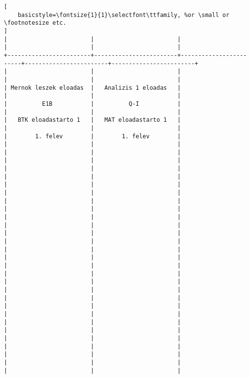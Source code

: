 \begin{lstlisting}[
    basicstyle=\fontsize{1}{1}\selectfont\ttfamily, %or \small or \footnotesize etc.
]
|                        |                        |                        |                        |                        | 
+------------------------+------------------------+------------------------+------------------------+------------------------+
|                        |                        |                        |                        |                        | 
| Mernok leszek eloadas  |   Analizis 1 eloadas   |                        |                        |                        | 
|          E1B           |          Q-I           |                        |                        |                        | 
|   BTK eloadastarto 1   |   MAT eloadastarto 1   |                        |                        |                        | 
|        1. felev        |        1. felev        |                        |                        |                        | 
|                        |                        |                        |                        |                        | 
|                        |                        |                        |                        |                        | 
|                        |                        |                        |                        |                        | 
|                        |                        |                        |                        |                        | 
|                        |                        |                        |                        |                        | 
|                        |                        |                        |                        |                        | 
|                        |                        |                        |                        |                        | 
|                        |                        |                        |                        |                        | 
|                        |                        |                        |                        |                        | 
|                        |                        |                        |                        |                        | 
|                        |                        |                        |                        |                        | 
|                        |                        |                        |                        |                        | 
|                        |                        |                        |                        |                        | 
|                        |                        |                        |                        |                        | 

\end{lstlisting}
